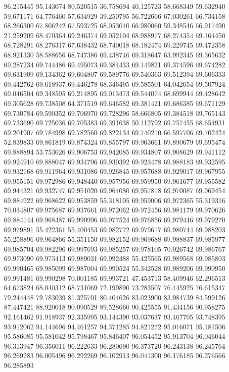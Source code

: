 96.215445
95.143074
80.520515
36.758694
40.125723
58.668349
59.632940
59.671171
64.776460
57.634929
39.250795
56.722666
67.030261
66.734158
68.266300
67.806242
67.593725
68.053040
66.980060
59.348546
66.917490
21.259209
68.470364
69.246374
69.052104
68.988977
68.274354
69.164450
68.728291
68.276317
67.638432
68.740018
68.182474
69.229745
69.472358
68.921330
58.588656
68.747386
69.438746
69.318647
63.992345
69.365632
69.287234
69.744486
69.495073
69.384433
69.149821
69.374596
69.674282
69.631909
69.134362
69.604807
69.589776
69.540363
69.512394
69.606333
69.442762
69.618937
69.446278
68.346495
69.585501
64.042654
69.507924
69.046504
69.348595
69.214895
69.013473
69.544074
68.699944
69.428642
69.305628
69.738508
64.371519
69.646582
69.381421
69.686385
69.671129
69.730784
69.590352
69.706970
69.728296
58.666805
69.384518
69.765143
69.733690
69.725036
69.705383
69.391638
50.112792
69.757455
68.654931
69.201907
69.784998
69.782560
69.822134
69.740210
66.597706
69.702424
52.839833
69.861819
69.874324
69.855797
69.963661
69.890679
69.695474
69.888894
53.753026
69.906753
69.942085
69.934807
69.908629
69.941112
69.924910
69.888047
69.934796
69.930392
69.923478
69.988183
69.932595
69.932168
69.911964
69.931086
69.926845
69.957688
69.929017
69.967955
69.955151
69.972986
69.948440
69.957956
69.959950
69.961677
69.955582
69.944321
69.932747
69.951020
69.964080
69.957818
69.970087
69.969454
69.884922
69.968622
69.953859
55.318105
69.959006
69.972365
55.319316
70.034807
69.975687
69.937661
69.972062
69.972456
69.981179
69.970626
69.884144
69.968487
69.990996
69.977524
69.976856
69.979446
69.979270
69.979891
55.422361
55.400453
69.982772
69.979617
69.980744
69.988203
55.258896
69.964866
55.351150
69.982152
69.969688
69.988837
69.985977
69.985704
69.982296
69.997693
69.985257
69.978105
70.026742
69.986767
69.973090
69.973413
69.989031
69.992488
55.425565
69.989568
69.985803
69.990465
69.985099
69.987004
69.990524
55.342528
69.989206
69.990950
69.991481
69.990298
70.001185
69.993721
47.453713
58.409946
62.296513
64.673824
68.040312
68.731069
72.199890
73.283507
76.445925
76.615347
79.244448
79.783039
81.325701
80.404626
83.023900
83.984739
84.599126
87.447421
88.920018
90.090529
89.528660
90.425555
91.434156
90.958275
92.161462
91.918937
92.335995
93.144390
93.037637
93.467705
93.748395
93.912062
94.144696
94.461257
94.371285
94.821272
95.016071
95.181506
95.586085
95.581042
95.798467
95.846407
96.054452
95.913704
96.046044
96.313947
96.356011
96.222633
96.280690
96.373720
96.243138
96.245764
96.269283
96.005496
96.292269
96.102913
96.041300
96.176185
96.276566
96.285893
